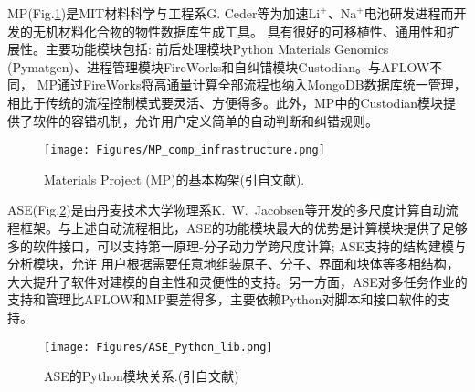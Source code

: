 \textrm{MP}(\textrm{Fig.}\ref{Auto_Flow_Platform-2})是\textrm{MIT}材料科学与工程系\textrm{G. Ceder}等为加速$\mathrm{Li}^+$、$\mathrm{Na}^+$电池研发进程而开发的无机材料化合物的物性数据库生成工具。%
具有很好的可移植性、通用性和扩展性。主要功能模块包括: 前后处理模块\textrm{Python Materials Genomics (Pymatgen)}\cite{CMS68-314_2013}、进程管理模块\textrm{FireWorks}和自纠错模块\textrm{Custodian}。与\textrm{AFLOW}不同， \textrm{MP}通过\textrm{FireWorks}将高通量计算全部流程也纳入\textrm{MongoDB}数据库统一管理，相比于传统的流程控制模式要灵活、方便得多。此外，\textrm{MP}中的\textrm{Custodian}模块提供了软件的容错机制，允许用户定义简单的自动判断和纠错规则。
\begin{figure}[h!]
\centering
\texttt{[image: Figures/MP\_comp\_infrastructure.png]}%
\caption{\textrm{Materials Project (MP)}的基本构架(引自文献\cite{CMS97-209_2015}).}%
\label{Auto_Flow_Platform-2}
\end{figure}

\textrm{ASE}(\textrm{Fig.}\ref{Auto_Flow_Platform-5})是由丹麦技术大学物理系\textrm{K.~W.~Jacobsen}等开发的多尺度计算自动流程框架。与上述自动流程相比，\textrm{ASE}的功能模块最大的优势是计算模块提供了足够多的软件接口，可以支持第一原理-分子动力学跨尺度计算; \textrm{ASE}支持的结构建模与分析模块，允许 用户根据需要任意地组装原子、分子、界面和块体等多相结构，大大提升了软件对建模的自主性和灵便性的支持。另一方面，\textrm{ASE}对多任务作业的支持和管理比\textrm{AFLOW}和\textrm{MP}要差得多，主要依赖\textrm{Python}对脚本和接口软件的支持。
\begin{figure}[h!]
\centering
\texttt{[image: Figures/ASE\_Python\_lib.png]}%
\caption{\textrm{ASE}的\textrm{Python}模块关系.(引自文献\cite{JPCM29-273002_2017})}
\label{Auto_Flow_Platform-5}
\end{figure}

